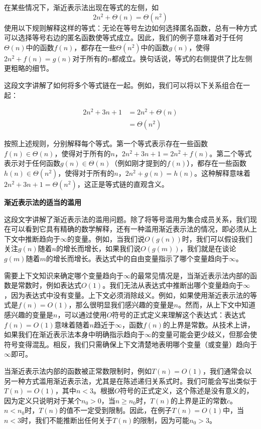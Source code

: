 \documentclass[lang=cn,newtx,10pt,scheme=chinese]{elegantbook}
\begin{document}
在某些情况下，渐近表示法出现在等式的左侧，如$$2 n^2+\Theta(n)=\Theta\left(n^2\right)$$使用以下规则解释这样的等式：无论在等号左边如何选择匿名函数，总有一种方式可以选择等号右边的匿名函数使等式成立。因此，我们的例子意味着对于任何$\Theta(n)$中的函数$f(n)$，都存在一些$\Theta\left(n^2\right)$中的函数$g(n)$，使得$2 n^2+f(n)=g(n)$对于所有的$n$都成立。换句话说，等式的右侧提供了比左侧更粗略的细节。

这段文字讲解了如何将多个等式链在一起。例如，我们可以将以下关系组合在一起：

$$
\begin{aligned}
2 n^2+3 n+1 & =2 n^2+\Theta(n) \\
& =\Theta\left(n^2\right)
\end{aligned}
$$

按照上述规则，分别解释每个等式。第一个等式表示存在一些函数$f(n) \in \Theta(n)$，使得对于所有的$n$，$2 n^2+3 n+1=2 n^2+f(n)$。第二个等式表示对于任何函数$g(n) \in \Theta(n)$（例如刚才提到的$f(n)$），都存在一些函数$h(n) \in \Theta\left(n^2\right)$，使得对于所有的$n$，$2 n^2+g(n)=h(n)$。这种解释意味着$2 n^2+3 n+1=\Theta\left(n^2\right)$，这正是等式链的直观含义。

\textbf{渐近表示法的适当的滥用}

这段文字讲解了渐近表示法的滥用问题。除了将等号滥用为集合成员关系，我们现在可以看到它具有精确的数学解释，还有一种滥用渐近表示法的情况，即必须从上下文中推断趋向于$\infty$的变量。例如，当我们说$O(g(n))$时，我们可以假设我们关注$g(n)$随着$n$的增长而增长，如果我们说$O(g(m))$，我们就是在谈论$g(m)$随着$m$的增长而增长。表达式中的自由变量指示了哪个变量趋向于$\infty$。

需要上下文知识来确定哪个变量趋向于$\infty$的最常见情况是，当渐近表示法内部的函数是常数时，例如表达式$O(1)$。我们无法从表达式中推断出哪个变量趋向于$\infty$，因为表达式中没有变量。上下文必须消除歧义。例如，如果使用渐近表示法的等式是$f(n)=O(1)$，那么很明显我们感兴趣的变量是$n$。然而，从上下文中知道感兴趣的变量是$n$，可以通过使用$O$符号的正式定义来理解这个表达式：表达式$f(n)=O(1)$意味着随着$n$趋近于$\infty$，函数$f(n)$的上界是常数。从技术上讲，如果我们在渐近表示法本身中明确指示趋向于$\infty$的变量可能会更少歧义，但那会使符号变得混乱。相反，我们只需确保上下文清楚地表明哪个变量（或变量）趋向于$\infty$即可。

当渐近表示法内部的函数被正常数限制时，例如$T(n)=O(1)$，我们通常会以另一种方式滥用渐近表示法，尤其是在陈述递归关系式时。我们可能会写出类似于$T(n)=O(1)$，其中$n<3$。根据$O$符号的正式定义，这个陈述是没有意义的，因为定义只说明对于某个$n_0>0$，当$n \geq n_0$时，$T(n)$的上界是正的常数$c$。$n<n_0$时，$T(n)$的值不一定受到限制。因此，在例子$T(n)=O(1)$中，当$n<3$时，我们不能推断出任何关于$T(n)$的限制，因为可能$n_0>3$。
\end{document}
